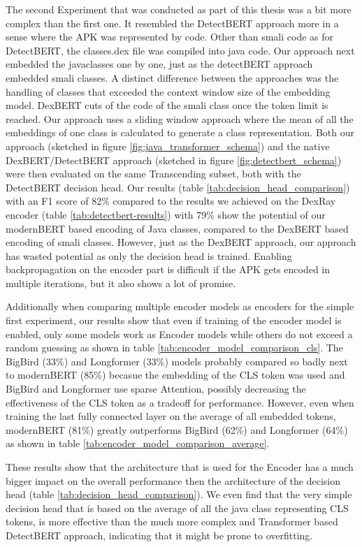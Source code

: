 The second Experiment that was conducted as part of this thesis was a bit more complex than the first one.
It resembled the DetectBERT approach more in a sense where the APK was represented by code.
Other than smali code as for DetectBERT, the classes.dex file was compiled into java code.
Our approach next embedded the javaclasses one by one, just as the detectBERT approach embedded smali classes.
A distinct difference between the approaches was the handling of classes that exceeded the 
context window size of the embedding model.
DexBERT cuts of the code of the smali class once the token limit is reached.
Our approach uses a sliding window approach where the mean of all the embeddings of one class is 
calculated to generate a class representation.
Both our approach (sketched in figure \ref{fig:java_transformer_schema}) and the 
native DexBERT/DetectBERT approach (sketched in figure \ref{fig:detectbert_schema}) were then evaluated on the same
Transcending subset, both with the DetectBERT decision head.
Our results (table \ref{tab:decision_head_comparison}) with an F1 score of 82\% compared to the 
results we achieved on the DexRay encoder (table \ref{tab:detectbert-results}) with 79\% show the 
potential of our modernBERT based encoding of Java classes, compared to the DexBERT based 
encoding of smali classes.
However, just as the DexBERT approach, our approach has wasted potential as only the decision 
head is trained. Enabling backpropagation on the encoder part is difficult if the APK gets 
encoded in multiple iterations, but it also shows a lot of promise.

Additionally when comparing multiple encoder models as encoders for the simple first experiment, 
our results show that even if training of the encoder model is enabled, only some models 
work as Encoder models while others do not exceed a random guessing as shown in table 
\ref{tab:encoder_model_comparison_cls}.
The BigBird (33\%) and Longformer (33\%) models probably compared so badly next 
to modernBERT (85\%) becasue the 
embedding of the CLS token was used and BigBird and Longformer use sparse Attention, possibly
decreasing the effectiveness of the CLS token as a tradeoff for performance.
However, even when training the last fully connected layer on the average of all embedded tokens, 
modernBERT (81\%) greatly outperforms BigBird (62\%) and Longformer (64\%) as shown in table 
\ref{tab:encoder_model_comparison_average}.

These results show that the architecture that is used for the Encoder has a much bigger 
impact on the overall performance then the architecture of the decision head 
(table \ref{tab:decision_head_comparison}).
We even find that the very simple decision head that is based on the average of all the 
java class representing CLS tokens, is more effective than the much more complex and 
Transformer based DetectBERT approach, indicating that it might be prone to overfitting.


